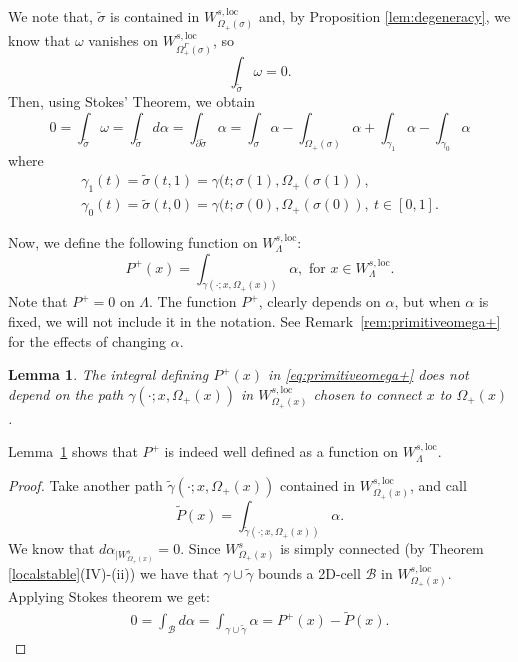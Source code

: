 \documentclass[11pt]{amsart}
\newtheorem{lem}[thm]{Lemma}
\theoremstyle{definition}
\theoremstyle{remark}
\numberwithin{equation}{section}
\begin{document}
We note that,
 $\tilde \sigma$ is contained in $W^{s,\mathrm{loc}}_{\Omega_+(\sigma)}$
and,  by Proposition \ref{lem:degeneracy},
we know that $\omega$ vanishes on $W^{s,\mathrm{loc}}_{\Omega_+^\Gamma(\sigma)}$, so
\[
\int_{\tilde\sigma}\omega= 0 .
\]
Then, using Stokes' Theorem, we obtain
\begin{equation}\label{eq:stokes1}
0=\int_{\tilde\sigma}\omega=\int_{\tilde\sigma}d\alpha=\int_{\partial\tilde\sigma}\alpha=\int_\sigma \alpha -\int_{\Omega_+(\sigma)}\alpha
+\int_{\gamma_1}\alpha
-\int_{\gamma_0}\alpha
\end{equation}
where
\[
\begin{split}
\gamma_1(t)=\tilde \sigma(t,1)=\gamma(t;\sigma(1),\Omega_+(\sigma(1)), \\
\gamma_0(t)=\tilde \sigma(t,0)=\gamma(t;\sigma(0),\Omega_+(\sigma(0)), \ t\in[0,1].
\end{split}
\]


Now, we define the following function on $W^{s,\mathrm{loc}}_\Lambda$:
\begin{equation}\label{eq:primitiveomega+}
P^+(x)=\int_{\gamma(\cdot;x,\Omega_+(x))}\alpha, \textrm { for } x\in W^{s,\mathrm{loc}}_\Lambda .
\end{equation} Note that
$P^+=0$ on $\Lambda$.
The function $P^+$, clearly depends on $\alpha$, but when $\alpha$ is fixed,
we will not include it in the notation. See Remark~\ref{rem:primitiveomega+} for the effects of
changing $\alpha$.


\begin{lem}\label{functiondefined}
The integral defining  $P^+(x)$
in \eqref{eq:primitiveomega+} does not depend on the path $\gamma(\cdot;x,\Omega_+(x))$ in
$W^{s,\mathrm{loc}}_{\Omega_+(x)}$ chosen to connect $x$ to $\Omega_+(x)$.
\end{lem}


Lemma~\ref{functiondefined}  shows that $P^+$ is indeed well defined as a
function on  $W^{s,\mathrm{loc}}_\Lambda$.

\begin{proof}
  Take another path $\tilde \gamma(\cdot;x,\Omega_+(x))$
contained in $W^{s,\mathrm{loc}}_{\Omega_+(x)}$, and call
\[
\tilde P(x)=\int_{\tilde \gamma(\cdot;x,\Omega_+(x))}\alpha .
\]
We know that
$d\alpha_{\mid W^s_{\Omega_+(x)}}=0$.
Since $W^s_{\Omega_+(x)}$ is simply connected  (by Theorem \ref{localstable}(IV)-(ii)) we have that $\gamma \cup \tilde \gamma$
bounds a 2D-cell $\mathcal{B}$   in $W^{s,\mathrm{loc}}_{\Omega_+(x)}$. Applying
Stokes theorem we get:
\[
\begin{split}
0= \int _{\mathcal{B}}d\alpha=
\int _{\gamma \cup \tilde \gamma}\alpha=P^+(x)-\tilde P(x) .
\end{split}
\]
\end{proof}
\end{document}
